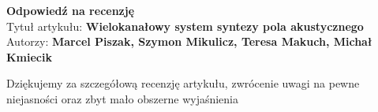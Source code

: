 \documentclass[12pt]{article}
\begin{document}
    
    \begin{center}
        \textbf{Odpowiedź na recenzję }\\
        \vspace{10pt}
        Tytuł artykułu: \textbf{Wielokanałowy system syntezy pola akustycznego} \\
        Autorzy: \textbf{Marcel Piszak, Szymon Mikulicz, Teresa Makuch, Michał Kmiecik}
    \end{center}

    Dziękujemy za szczegółową recenzję artykułu, zwrócenie uwagi na pewne niejasności oraz zbyt mało obszerne wyjaśnienia

    
\end{document}
